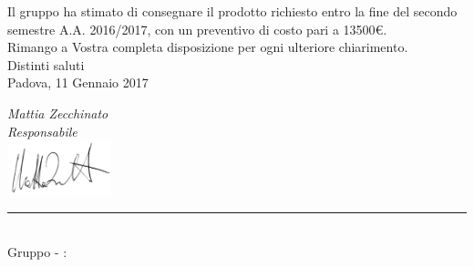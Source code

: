 \begin{titlepage}
\begin{large}
	Il gruppo \GroupName{} ha stimato di consegnare il prodotto richiesto entro la fine del secondo semestre A.A. 2016/2017, con un preventivo di costo pari a 13500€.\\
	
	Rimango a Vostra completa disposizione per ogni ulteriore chiarimento. \\
	
	Distinti saluti\\
	
	\vspace{0.5cm} 
	Padova, 11 Gennaio 2017
	\begin{flushright}
		\emph{Mattia Zecchinato} \\ 
		\emph{Responsabile \GroupName{}} \\ 
		\includegraphics[width=3cm]{../../firme/MZ.png}
	\end{flushright}
	
	\end{large}
	
	\vspace{1cm} 
	\begin{center}
		\rule{13cm}{0,03cm} \\
		Gruppo \GroupName{} - \email: \GroupEmail{}
	\end{center} 
	
	
	\end{titlepage}
  
 \restoregeometry
